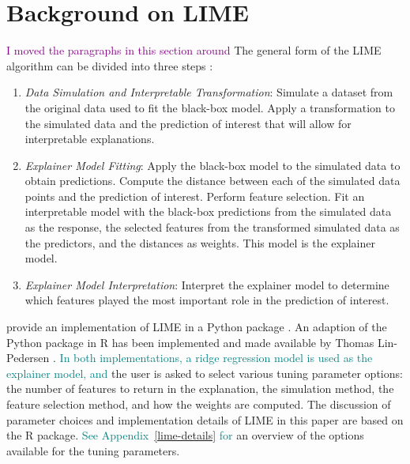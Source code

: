 \documentclass[AMS,STIX2COL]{WileyNJD-v2}\usepackage[]{graphicx}\usepackage[]{color}
\newcommand{\kgc}[1]{\textcolor{purple}{#1}}
\newcommand{\kge}[1]{\textcolor{teal}{#1}}
\renewcommand{\sout}[1]{\unskip}
\begin{document}
\section{Background on LIME} \label{background}

\kgc{I moved the paragraphs in this section around} The general form of the LIME algorithm can be divided into three steps \citep[see also][]{laugel:2018}:

\begin{enumerate}

\item \emph{Data Simulation and Interpretable Transformation}: Simulate a dataset from the original data used to fit the black-box model. Apply a transformation to the simulated data and the prediction of interest that will allow for interpretable explanations.

\item \emph{Explainer Model Fitting}: Apply the black-box model to the simulated data to obtain predictions. Compute the distance between each of the simulated data points and the prediction of interest. Perform feature selection. Fit an interpretable model with the black-box predictions from the simulated data as the response, the selected features from the transformed simulated data as the predictors, and the distances as weights. This model is the explainer model.

\item \emph{Explainer Model Interpretation}: Interpret the explainer model to determine which features played the most important role in the prediction of interest.

\end{enumerate}

\citet{ribeiro:2016} provide an implementation of LIME in a Python package \cite{ribeiro:2020}. An adaption of the Python package in R has been implemented and made available by Thomas Lin-Pedersen \citep{pedersen:2020}. \kge{In both implementations, a ridge regression model is used as the explainer model, and} \sout{During the application of LIME, t} the user is asked to select various tuning parameter options: the number of features to return in the explanation, the simulation method, the feature selection method, and how the weights are computed. The discussion of parameter choices and implementation details of LIME in this paper are based on the R package. \kge{See Appendix~\ref{lime-details} for}
an overview of the options available for the tuning parameters\sout{ is included in Appendix~\ref{lime-details}}.
\end{document}
